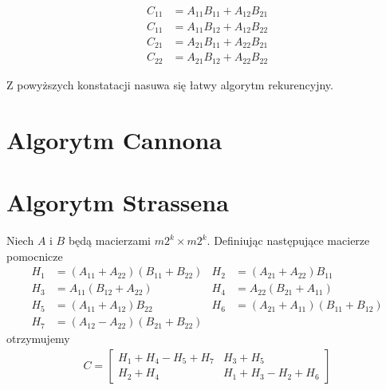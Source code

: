 \begin{equation}
\begin{split}
C_{11} &= A_{11}B_{11} + A_{12}B_{21}\\
C_{11} &= A_{11}B_{12} + A_{12}B_{22}\\
C_{21} &= A_{21}B_{11} + A_{22}B_{21}\\
C_{22} &= A_{21}B_{12} + A_{22}B_{22}
\end{split}
\end{equation}

Z powyższych konstatacji nasuwa się łatwy algorytm rekurencyjny.

\begin{algorithm}
\;
\end{algorithm}
\section{Algorytm Cannona}
\cite{Cannon:1969:CCI:905686}
\section{Algorytm Strassena}
Niech \(A\) i \(B\) będą macierzami \(m2^k\times m2^k\). Definiując następujące macierze pomocnicze
\begin{align*}
H_1 &= (A_{11}+A_{22})(B_{11}+B_{22})&
 H_2 &= (A_{21}+A_{22})B_{11}\\
H_3 &= A_{11}(B_{12} + A_{22})&
 H_4 &= A_{22}(B_{21} + A_{11})\\
H_5 &= (A_{11}+A_{12})B_{22}&
 H_6 &= (A_{21} + A_{11})(B_{11} + B_{12}) \\
H_7 &= (A_{12}-A_{22})(B_{21}+B_{22}) 
\end{align*}
otrzymujemy
\begin{align}
C = \begin{bmatrix}
H_1+H_4-H_5+H_7& H_3+H_5\\
H_2+H_4& H_1+H_3-H_2+H_6
\end{bmatrix}
\end{align}

